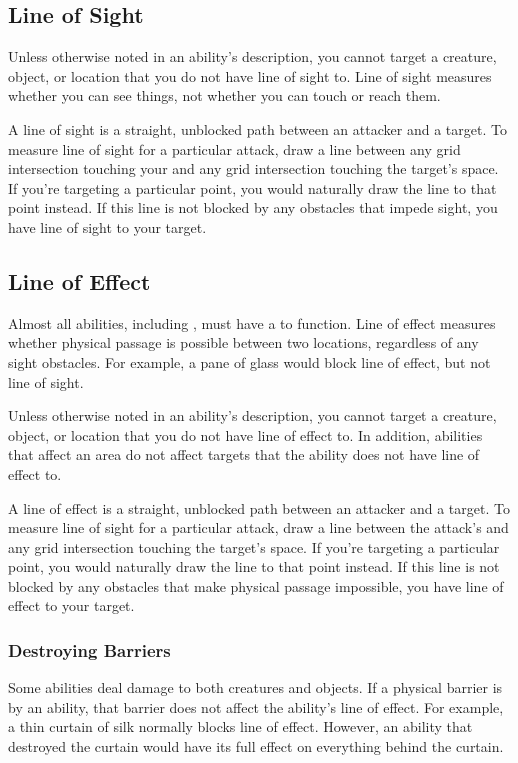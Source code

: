     \subsection{Line of Sight}\label{Line of Sight}
        Unless otherwise noted in an ability's description, you cannot target a creature, object, or location that you do not have line of sight to.
        Line of sight measures whether you can see things, not whether you can touch or reach them.

        A line of sight is a straight, unblocked path between an attacker and a target.
        To measure line of sight for a particular attack, draw a line between any grid intersection touching your  and any grid intersection touching the target's space.
        If you're targeting a particular point, you would naturally draw the line to that point instead.
        If this line is not blocked by any obstacles that impede sight, you have line of sight to your target.

    \subsection{Line of Effect}\label{Line of Effect}
        Almost all abilities, including , must have a  to function.
        Line of effect measures whether physical passage is possible between two locations, regardless of any sight obstacles.
        For example, a pane of glass would block line of effect, but not line of sight.

        Unless otherwise noted in an ability's description, you cannot target a creature, object, or location that you do not have line of effect to.
        In addition, abilities that affect an area do not affect targets that the ability does not have line of effect to.

        A line of effect is a straight, unblocked path between an attacker and a target.
        To measure line of sight for a particular attack, draw a line between the attack's  and any grid intersection touching the target's space.
        If you're targeting a particular point, you would naturally draw the line to that point instead.
        If this line is not blocked by any obstacles that make physical passage impossible, you have line of effect to your target.

        \subsubsection{Destroying Barriers}\label{Destroying Barriers}
            Some abilities deal damage to both creatures and objects.
            If a physical barrier is  by an ability, that barrier does not affect the ability's line of effect.
            For example, a thin curtain of silk normally blocks line of effect.
            However, an ability that destroyed the curtain would have its full effect on everything behind the curtain.

